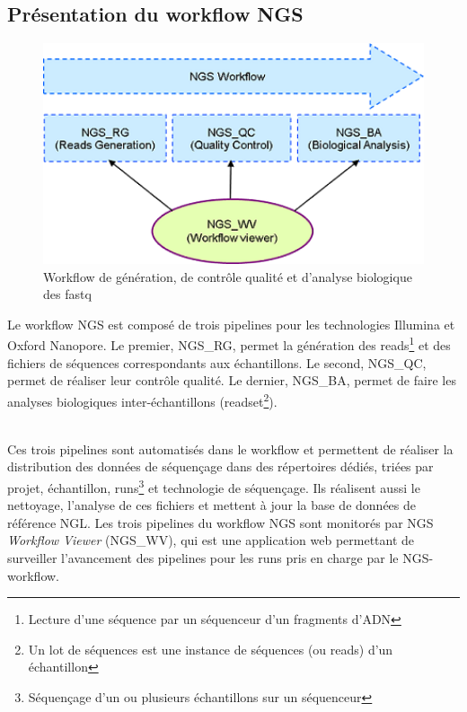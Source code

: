 \subsection{Présentation du workflow NGS}
\begin{minipage}{0.45\textwidth}
	\begin{figure}[H]
		\centering
		\includegraphics[width=1\textwidth]{img/Workflow.png}
		\caption{\footnotesize{Workflow de génération, de contrôle qualité et d’analyse biologique des fastq}}
		\label{worflow-genoscope}
	\end{figure}
\end{minipage}
\hfill
\begin{minipage}{0.45\textwidth}
	Le workflow NGS est composé de trois pipelines pour les technologies Illumina et Oxford Nanopore. Le premier, NGS\_RG, permet la génération des reads\footnote{Lecture d'une séquence par un séquenceur d'un fragments d'ADN} et des fichiers de séquences correspondants aux échantillons. Le second, NGS\_QC, permet de réaliser leur contrôle qualité. Le dernier, NGS\_BA, permet de faire les analyses biologiques inter-échantillons (readset\footnote{Un lot de séquences est une instance de séquences (ou reads) d'un échantillon}). 
\end{minipage}\\[0.1cm]

Ces trois pipelines sont automatisés dans le workflow et permettent de réaliser la distribution des données de séquençage dans des répertoires dédiés, triées par projet, échantillon, runs\footnote{Séquençage d'un ou plusieurs échantillons sur un séquenceur} et technologie de séquençage. Ils réalisent aussi le nettoyage, l'analyse de ces fichiers et mettent à jour la base de données de référence NGL. Les trois pipelines du workflow NGS sont monitorés par NGS \emph{Workflow Viewer} (NGS\_WV), qui est une application web permettant de surveiller l'avancement des pipelines pour les runs pris en charge par le NGS-workflow.

